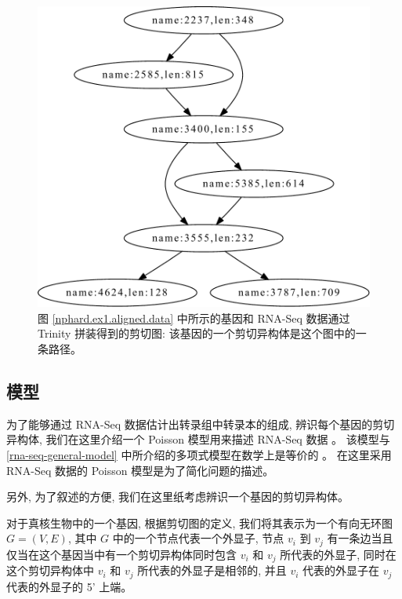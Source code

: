 \begin{figure}[!t]
\centering
\includegraphics[width=\textwidth]{figures/nphard/comp1.pdf}
\caption[图 \ref{nphard.ex1.aligned.data} 中所示的基因和 
RNA-Seq 数据通过 Trinity \cite{grabherr2011full} 拼装得到的剪切图]
{图 \ref{nphard.ex1.aligned.data} 中所示的基因和 
RNA-Seq 数据通过 Trinity \cite{grabherr2011full} 拼装得到的剪切图: 
该基因的一个剪切异构体是这个图中的一条路径。}
\label{nphard.ex1.splicing.graph}
\end{figure}

\subsection{模型}
\label{nphard-model}

为了能够通过 RNA-Seq 数据估计出转录组中转录本的组成, 辨识每个基因的剪切异构体, 
我们在这里介绍一个 Poisson 模型用来描述 RNA-Seq 数据 \cite{Jiang15042009}。 
该模型与 \ref{rna-seq-general-model} 中所介绍的多项式模型在数学上是等价的 
\cite{2011arXiv1104.3889P}。 
在这里采用 RNA-Seq 数据的 Poisson 模型是为了简化问题的描述。 

另外, 为了叙述的方便, 我们在这里纸考虑辨识一个基因的剪切异构体。 

对于真核生物中的一个基因, 根据剪切图的定义, 
我们将其表示为一个有向无环图 $G=(V,E)$, 其中 $G$ 中的一个节点代表一个外显子, 
节点 $v_i$ 到 $v_j$ 有一条边当且仅当在这个基因当中有一个剪切异构体同时包含 
$v_i$ 和 $v_j$ 所代表的外显子, 
同时在这个剪切异构体中 $v_i$ 和 $v_j$ 所代表的外显子是相邻的, 
并且 $v_i$ 代表的外显子在 $v_j$ 代表的外显子的 5' 上端。 

